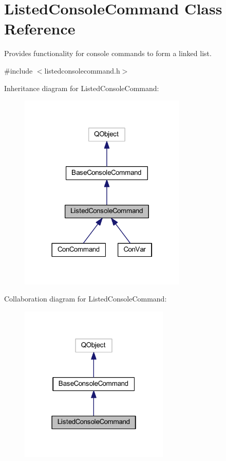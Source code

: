 \hypertarget{class_listed_console_command}{\section{Listed\-Console\-Command Class Reference}
\label{class_listed_console_command}
}


Provides functionality for console commands to form a linked list.  




{\ttfamily \#include $<$listedconsolecommand.\-h$>$}



Inheritance diagram for Listed\-Console\-Command\-:\nopagebreak
\begin{figure}[H]
\begin{center}
\leavevmode
\includegraphics[width=225pt]{class_listed_console_command__inherit__graph}
\end{center}
\end{figure}


Collaboration diagram for Listed\-Console\-Command\-:\nopagebreak
\begin{figure}[H]
\begin{center}
\leavevmode
\includegraphics[width=202pt]{class_listed_console_command__coll__graph}
\end{center}
\end{figure}
